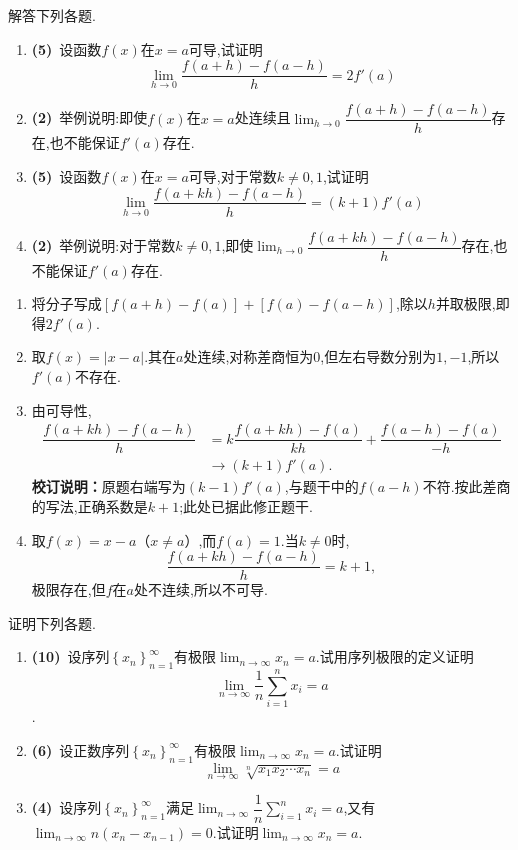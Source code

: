 \documentclass{ctexart}
\begin{document}
\begin{problem}[5.(14\songti{分})]
    解答下列各题.
    \begin{enumerate}[label=\textbf{(\arabic*)}]
        \item \textbf{(5)}\ 设函数$f(x)$在$x=a$可导,试证明$$\lim_{h\to0}\dfrac{f(a+h)-f(a-h)}{h}=2f'(a)$$
        \item \textbf{(2)}\ 举例说明:即使$f(x)$在$x=a$处连续且$\displaystyle\lim_{h\to0}\dfrac{f(a+h)-f(a-h)}{h}$存在,也不能保证$f'(a)$存在.
        \item \textbf{(5)}\ 设函数$f(x)$在$x=a$可导,对于常数$k\neq0,1$,试证明$$\lim_{h\to0}\dfrac{f(a+kh)-f(a-h)}{h}=(k+1)f'(a)$$
        \item \textbf{(2)}\ 举例说明:对于常数$k\neq0,1$,即使$\displaystyle\lim_{h\to0}\dfrac{f(a+kh)-f(a-h)}{h}$存在,也不能保证$f'(a)$存在.
    \end{enumerate}
\end{problem}
\begin{solution}
\begin{enumerate}[label=\textbf{(\arabic*)}]
        \item 将分子写成$[f(a+h)-f(a)]+[f(a)-f(a-h)]$,除以$h$并取极限,即得$2f'(a)$.
        \item 取$f(x)=|x-a|$.其在$a$处连续,对称差商恒为$0$,但左右导数分别为$1,-1$,所以$f'(a)$不存在.
        \item 由可导性,
            \[\begin{aligned}
            \dfrac{f(a+kh)-f(a-h)}h
            &=k\dfrac{f(a+kh)-f(a)}{kh}+\dfrac{f(a-h)-f(a)}{-h}\\
            &\longrightarrow(k+1)f'(a).
            \end{aligned}\]
            \textbf{校订说明：}原题右端写为$(k-1)f'(a)$,与题干中的$f(a-h)$不符.按此差商的写法,正确系数是$k+1$;此处已据此修正题干.
        \item 取$f(x)=x-a$（$x\neq a$）,而$f(a)=1$.当$k\neq0$时,
            \[\dfrac{f(a+kh)-f(a-h)}h=k+1,\]
            极限存在,但$f$在$a$处不连续,所以不可导.
    \end{enumerate}
\end{solution}
\begin{problem}[6.(20\songti{分})]
    证明下列各题.
        \begin{enumerate}[label=\textbf{(\arabic*)}]
            \item \textbf{(10)}\ 设序列$\left\{x_n\right\}_{n=1}^{\infty}$有极限$\displaystyle\lim_{n\to\infty}x_n=a$.试用序列极限的定义证明$$\displaystyle\lim_{n\to\infty}\dfrac{1}{n}\sum_{i=1}^{n}x_i=a$$.
            \item \textbf{(6)}\ 设正数序列$\left\{x_n\right\}_{n=1}^{\infty}$有极限$\displaystyle\lim_{n\to\infty}x_n=a$.试证明$$\lim_{n\to\infty}\sqrt[n]{x_1x_2\cdots x_n}=a$$
            \item \textbf{(4)}\ 设序列$\left\{x_n\right\}_{n=1}^{\infty}$满足$\displaystyle\lim_{n\to\infty}\dfrac{1}{n}\sum_{i=1}^{n}x_i=a$,又有$\displaystyle\lim_{n\to\infty}n\left(x_n-x_{n-1}\right)=0$.试证明$\displaystyle\lim_{n\to\infty}x_n=a$.
        \end{enumerate}
\end{problem}
\end{document}
